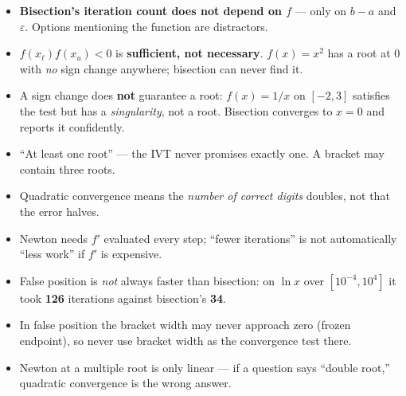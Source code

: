 \begin{trapbox}
\begin{itemize}
\item \textbf{Bisection's iteration count does not depend on $f$} --- only on $b-a$ and $\varepsilon$. Options mentioning the function are distractors.
\item $f(x_\ell)f(x_u)<0$ is \textbf{sufficient, not necessary}. $f(x)=x^2$ has a root at $0$ with \emph{no} sign change anywhere; bisection can never find it.
\item A sign change does \textbf{not} guarantee a root: $f(x)=1/x$ on $[-2,3]$ satisfies the test but has a \emph{singularity}, not a root. Bisection converges to $x=0$ and reports it confidently.
\item ``At least one root'' --- the IVT never promises exactly one. A bracket may contain three roots.
\item Quadratic convergence means the \emph{number of correct digits} doubles, not that the error halves.
\item Newton needs $f'$ evaluated every step; ``fewer iterations'' is not automatically ``less work'' if $f'$ is expensive.
\item False position is \emph{not} always faster than bisection: on $\ln x$ over $[10^{-4},10^4]$ it took \textbf{126} iterations against bisection's \textbf{34}.
\item In false position the bracket width may never approach zero (frozen endpoint), so never use bracket width as the convergence test there.
\item Newton at a multiple root is only linear --- if a question says ``double root,'' quadratic convergence is the wrong answer.
\end{itemize}
\end{trapbox}
